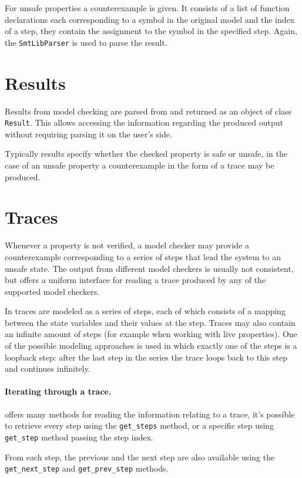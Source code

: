 For unsafe properties a counterexample is given. It consists of a list of function declarations each corresponding to a symbol in the original model and the index of a step, they contain the assignment to the symbol in the specified step. Again, the \texttt{SmtLibParser} is used to parse the result.


\section{Results}
Results from model checking are parsed from \pyvmt{} and returned as an object of class \texttt{Result}.
This allows accessing the information regarding the produced output without requiring parsing it on the user's side.

Typically results specify whether the checked property is safe or unsafe, in the case of an unsafe property a counterexample in the form of a trace may be produced.

\section{Traces}
Whenever a property is not verified, a model checker may provide a counterexample corresponding to a series of steps that lead the system to an unsafe state.
The output from different model checkers is usually not consistent, but \pyvmt{} offers a uniform interface for reading a trace produced by any of the supported model checkers.

In \pyvmt{} traces are modeled as a series of steps, each of which consists of a mapping between the state variables and their values at the step.
Traces may also contain an infinite amount of steps (for example when working with live properties).
One of the possible modeling approaches is used in which exactly one of the steps is a loopback step: after the last step in the series the trace loops back to this step and continues infinitely.

\paragraph*{Iterating through a trace.}
\pyvmt{} offers many methods for reading the information relating to a trace, it's possible to retrieve every step using the \texttt{get\_steps} method, or a specific step using \texttt{get\_step} method passing the step index.

From each step, the previous and the next step are also available using the \texttt{get\_next\_step} and \texttt{get\_prev\_step} methods.

